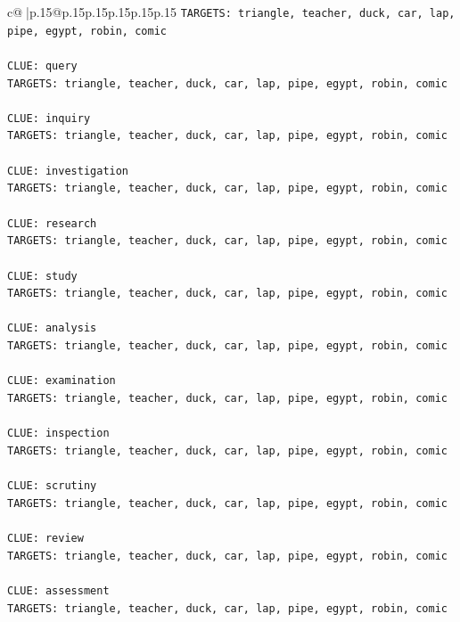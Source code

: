 \documentclass{article}
\begin{document}
{\begin{supertabular}{c@{$\;$}|p{.15\linewidth}@{}p{.15\linewidth}p{.15\linewidth}p{.15\linewidth}p{.15\linewidth}p{.15\linewidth}}
{{{\texttt{TARGETS: triangle, teacher, duck, car, lap, pipe, egypt, robin, comic} \\
\\ 
\texttt{CLUE: query} \\
\texttt{TARGETS: triangle, teacher, duck, car, lap, pipe, egypt, robin, comic} \\
\\ 
\texttt{CLUE: inquiry} \\
\texttt{TARGETS: triangle, teacher, duck, car, lap, pipe, egypt, robin, comic} \\
\\ 
\texttt{CLUE: investigation} \\
\texttt{TARGETS: triangle, teacher, duck, car, lap, pipe, egypt, robin, comic} \\
\\ 
\texttt{CLUE: research} \\
\texttt{TARGETS: triangle, teacher, duck, car, lap, pipe, egypt, robin, comic} \\
\\ 
\texttt{CLUE: study} \\
\texttt{TARGETS: triangle, teacher, duck, car, lap, pipe, egypt, robin, comic} \\
\\ 
\texttt{CLUE: analysis} \\
\texttt{TARGETS: triangle, teacher, duck, car, lap, pipe, egypt, robin, comic} \\
\\ 
\texttt{CLUE: examination} \\
\texttt{TARGETS: triangle, teacher, duck, car, lap, pipe, egypt, robin, comic} \\
\\ 
\texttt{CLUE: inspection} \\
\texttt{TARGETS: triangle, teacher, duck, car, lap, pipe, egypt, robin, comic} \\
\\ 
\texttt{CLUE: scrutiny} \\
\texttt{TARGETS: triangle, teacher, duck, car, lap, pipe, egypt, robin, comic} \\
\\ 
\texttt{CLUE: review} \\
\texttt{TARGETS: triangle, teacher, duck, car, lap, pipe, egypt, robin, comic} \\
\\ 
\texttt{CLUE: assessment} \\
\texttt{TARGETS: triangle, teacher, duck, car, lap, pipe, egypt, robin, comic} \\
}}}
\end{supertabular}}
\end{document}
